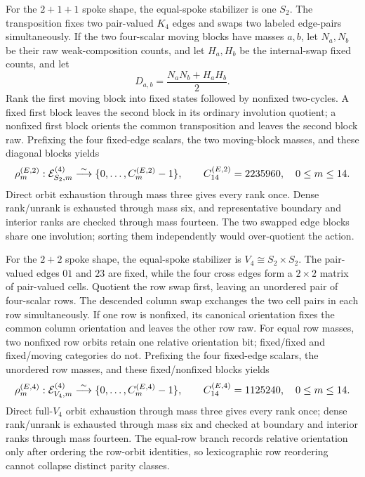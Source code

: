 \documentclass{article}
\newcommand{\fitmath}[1]{\resizebox{0.99\linewidth}{!}{$\displaystyle #1$}}
\begin{document}
For the $2+1+1$ spoke shape, the equal-spoke stabilizer is one $S_2$.
The transposition fixes two pair-valued $K_4$ edges and swaps two labeled
edge-pairs simultaneously. If the two four-scalar moving blocks have masses
$a,b$, let $N_{a},N_{b}$ be their raw weak-composition counts, and let
$H_{a},H_{b}$ be
the internal-swap fixed counts, and let
\[
  D_{a,b}=\frac{N_{a}N_{b}+H_{a}H_{b}}{2}.
\]
Rank the first moving block into fixed states followed by nonfixed two-cycles.
A fixed first block leaves the second block in its ordinary involution quotient;
a nonfixed first block orients the common transposition and leaves the second
block raw. Prefixing the four fixed-edge scalars, the two moving-block masses,
and these diagonal blocks yields
\begin{equation}
  \fitmath{%
    \rho^{(E,2)}_m:
      \mathcal E^{(4)}_{S_2,m}
      \overset{\sim}{\longrightarrow}
      \{0,\ldots,C^{(E,2)}_m-1\},
    \qquad C^{(E,2)}_{14}=2235960,
    \quad 0\leq m\leq14.
  }
  \label{eq:optimization-crazy-preimage-cube-quintuple-s4-s2-edge-ranking}
\end{equation}
Direct orbit exhaustion through mass three gives every rank once. Dense
rank/unrank is exhausted through mass six, and representative boundary and
interior ranks are checked through mass fourteen. The two swapped edge blocks
share one involution; sorting them independently would over-quotient the action.

For the $2+2$ spoke shape, the equal-spoke stabilizer is
$V_4\cong S_2\times S_2$. The pair-valued edges $01$ and $23$ are fixed, while
the four cross edges form a $2\times2$ matrix of pair-valued cells. Quotient the
row swap first, leaving an unordered pair of four-scalar rows. The descended
column swap exchanges the two cell pairs in each row simultaneously. If one row
is nonfixed, its canonical orientation fixes the common column orientation and
leaves the other row raw. For equal row masses, two nonfixed row orbits retain
one relative orientation bit; fixed/fixed and fixed/moving categories do not.
Prefixing the four fixed-edge scalars, the unordered row masses, and these
fixed/nonfixed blocks yields
\begin{equation}
  \fitmath{%
    \rho^{(E,4)}_m:
      \mathcal E^{(4)}_{V_4,m}
      \overset{\sim}{\longrightarrow}
      \{0,\ldots,C^{(E,4)}_m-1\},
    \qquad C^{(E,4)}_{14}=1125240,
    \quad 0\leq m\leq14.
  }
  \label{eq:optimization-crazy-preimage-cube-quintuple-s4-v4-edge-ranking}
\end{equation}
Direct full-$V_4$ orbit exhaustion through mass three gives every rank once;
dense rank/unrank is exhausted through mass six and checked at boundary and
interior ranks through mass fourteen. The equal-row branch records relative
orientation only after ordering the row-orbit identities, so lexicographic row
reordering cannot collapse distinct parity classes.
\end{document}
